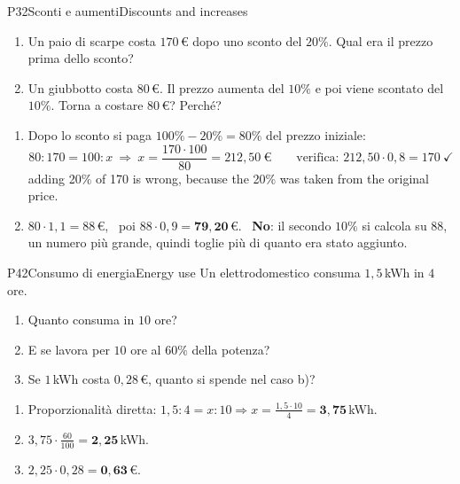 \begin{esercizio}{P3}{2}{Sconti e aumenti}{Discounts and increases}
\begin{enumerate}
\item Un paio di scarpe costa $170$\,€ dopo uno sconto del $20\%$. Qual era il prezzo prima dello sconto?
\item Un giubbotto costa $80$\,€. Il prezzo aumenta del $10\%$ e poi viene scontato del $10\%$. Torna a costare $80$\,€? Perché?
\end{enumerate}
\end{esercizio}
\begin{solbox}
\begin{enumerate}
\item Dopo lo sconto si paga $100\%-20\%=80\%$ del prezzo iniziale:
\[80:170=100:x\ \Rightarrow\ x=\frac{170\cdot100}{80}=\boxed{212,50\ \text{€}}\qquad\text{verifica: } 212,50\cdot0,8=170\ \checkmark\]
{adding 20\% of 170 is wrong, because the 20\% was taken from the original price.}
\item $80\cdot1,1=88$\,€, \ poi $88\cdot0,9=\mathbf{79,20}$\,€. \ \textbf{No}: il secondo $10\%$ si calcola su $88$, un numero più grande, quindi toglie più di quanto era stato aggiunto.
\end{enumerate}
\end{solbox}

\begin{esercizio}{P4}{2}{Consumo di energia}{Energy use}
Un elettrodomestico consuma $1,5$\,kWh in $4$ ore.
\begin{enumerate}
\item Quanto consuma in $10$ ore? 
\item E se lavora per $10$ ore al $60\%$ della potenza? 
\item Se $1$\,kWh costa $0,28$\,€, quanto si spende nel caso b)? 
\end{enumerate}
\end{esercizio}
\begin{solbox}
\begin{enumerate}
\item Proporzionalità diretta: $1,5:4=x:10\Rightarrow x=\frac{1,5\cdot10}{4}=\mathbf{3,75}$\,kWh.
\item $3,75\cdot\frac{60}{100}=\mathbf{2,25}$\,kWh.
\item $2,25\cdot0,28=\mathbf{0,63}$\,€.
\end{enumerate}
\end{solbox}

